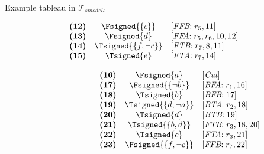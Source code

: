 \begin{frame}{Example tableau in $\mathcal{T}_{\textit{smodels}}$}
\begin{center}
\begin{minipage}[t]{16cm}
\begin{minipage}[t]{4.5cm}
\[\begin{array}{lcl}
\textbf{(12)}                                      &
  \Fsigned{\{c\}}                                  &
  [\textit{FFB}{:}\;r_5, \text{11}]                \\
\textbf{(13)}                                      &
  \Fsigned{d}                                      &
  [\textit{FFA}{:}\;r_5,r_6, \text{10}, \text{12}] \\
\textbf{(14)}                                      &
  \Tsigned{\{f,\neg c\}}                   &
  [\textit{FTB}{:}\;r_7, \text{8}, \text{11}]      \\
\textbf{(15)}                                      &
  \Tsigned{e}                                      &
  [\textit{FTA}{:}\;r_7, \text{14}]
\end{array}
\]
\end{minipage}
\begin{minipage}[t]{6cm}
\[
\hspace{2.2cm}
\begin{array}{lcl}
\textbf{(16)}                                      &
  \Fsigned{a}                                      &
  [\textit{Cut}]                                   \\
\textbf{(17)}                                      &
  \Fsigned{\{\neg b\}}                     &
  [\textit{BFA}{:}\; r_1, \text{16}]               \\
\textbf{(18)}                                      &
  \Tsigned{b}                                      &
  [\textit{BFB}{:}\; \text{17}]                    \\
\textbf{(19)}                                      &
  \Tsigned{\{d,\neg a\}}                   &
  [\textit{BTA}{:}\;r_2, \text{18}]                \\
\textbf{(20)}                                      &
  \Tsigned{d}                                      &
  [\textit{BTB}{:}\;\text{19}]                     \\
\textbf{(21)}                                      &
  \Tsigned{\{b,d\}}                                &
  [\textit{FTB}{:}\;r_3, \text{18}, \text{20}]     \\
\textbf{(22)}                                      &
  \Tsigned{c}                                      &
  [\textit{FTA}{:}\;r_3, \text{21}]                \\
\textbf{(23)}                                      &
  \Fsigned{\{f,\neg c\}}                   &
  [\textit{FFB}{:}\;r_7, \text{22}]                \\

\end{array}\]
\end{minipage}
\end{minipage}
\end{center}
\end{frame}
